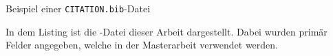 \begin{listing}
  \inputminted{text}{../CITATION.bib}
  \caption{Beispiel einer \texttt{CITATION.bib}-Datei}
  \label{lst:bibtex_example}
  \small
  In dem Listing ist die -Datei dieser Arbeit dargestellt. Dabei wurden primär Felder angegeben, welche in der Masterarbeit verwendet werden.
\end{listing}
